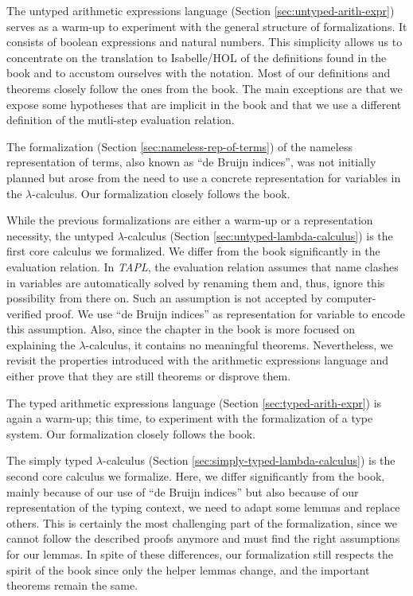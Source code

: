 The untyped arithmetic expressions language (Section \ref{sec:untyped-arith-expr}) serves as a
warm-up to experiment with the general structure of formalizations. It consists of boolean
expressions and natural numbers. This simplicity allows us to concentrate on the translation to
Isabelle/HOL of the definitions found in the book and to accustom ourselves with the notation. Most
of our definitions and theorems closely follow the ones from the book. The main exceptions are
that we expose some hypotheses that are implicit in the book and that we use a different definition
of the mutli-step evaluation relation.

The formalization (Section \ref{sec:nameless-rep-of-terms}) of the nameless representation of terms,
also known as ``de Bruijn indices'', was not initially planned but arose from the need to use a
concrete representation for variables in the $\lambda$-calculus. Our formalization closely follows
the book.

While the previous formalizations are either a warm-up or a representation necessity, the untyped
$\lambda$-calculus (Section \ref{sec:untyped-lambda-calculus}) is the first core calculus we
formalized. We differ from the book significantly in the evaluation relation. In \emph{TAPL}, the
evaluation relation assumes that name clashes in variables are automatically solved by renaming
them and, thus, ignore this possibility from there on. Such an assumption is not accepted by
computer-verified proof. We use ``de Bruijn indices'' as representation for variable to encode this
assumption. Also, since the chapter in the book is more focused on explaining the
$\lambda$-calculus, it contains no meaningful theorems. Nevertheless, we revisit the properties
introduced with the arithmetic expressions language and either prove that they are still theorems
or disprove them.

The typed arithmetic expressions language (Section \ref{sec:typed-arith-expr}) is again a warm-up;
this time, to experiment with the formalization of a type system. Our formalization closely follows
the book.

The simply typed $\lambda$-calculus (Section \ref{sec:simply-typed-lambda-calculus}) is the second
core calculus we formalize. Here, we differ significantly from the book, mainly because of our use
of ``de Bruijn indices'' but also because of our representation of the typing context, we need to
adapt some lemmas and replace others. This is certainly the most challenging part of the
formalization, since we cannot follow the described proofs anymore and must find the right
assumptions for our lemmas. In spite of these differences, our formalization still respects the
spirit of the book since only the helper lemmas change, and the important theorems remain the same.

